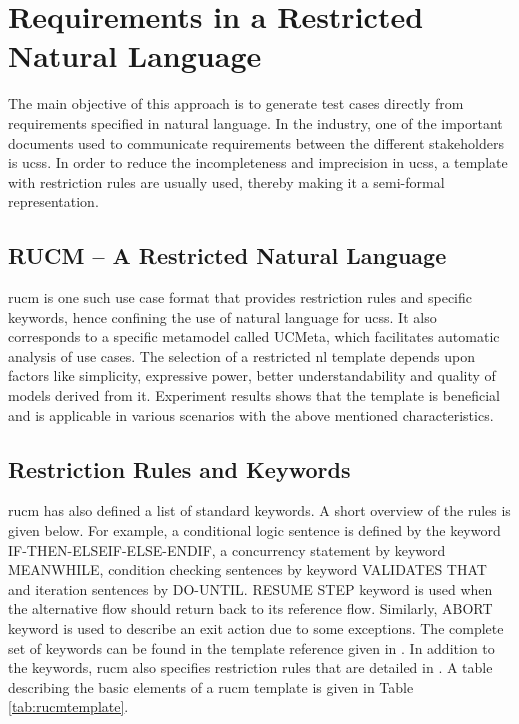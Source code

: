 \section{Requirements in a Restricted Natural Language}
The main objective of this approach is to generate test cases directly from requirements specified in natural language. In the industry, one of the important documents used to communicate requirements between the different stakeholders is \glspl{ucs}. In order to reduce the incompleteness and imprecision in \glspl{ucs}, a template with restriction rules are usually used, thereby making it a semi-formal representation. 

\subsection{RUCM – A Restricted Natural Language}
\gls{rucm} \cite{yue2013facilitating} is one such use case format that provides restriction rules and specific keywords, hence confining the use of natural language for \glspl{ucs}. It also corresponds to a specific metamodel called UCMeta, which facilitates automatic analysis of use cases. The selection of a restricted \gls{nl} template depends upon factors like simplicity, expressive power, better understandability and quality of models derived from it. Experiment results \cite{yue2013facilitating} shows that the template is beneficial and is applicable in various scenarios with the above mentioned characteristics.

\subsection{Restriction Rules and Keywords}
\gls{rucm} has also defined a list of standard keywords. A short overview of the rules is given below. For example, a conditional logic sentence is defined by the keyword IF-THEN-ELSEIF-ELSE-ENDIF, a concurrency statement by keyword MEANWHILE, condition checking sentences by keyword VALIDATES THAT and iteration sentences by DO-UNTIL. RESUME STEP keyword is used when the alternative flow should return back to its reference flow. Similarly, ABORT keyword is used to describe an exit action due to some exceptions.  The complete set of keywords can be found in the template reference given in \cite{yue2013facilitating}. In addition to the keywords, \gls{rucm} also specifies restriction rules that are detailed in \cite{yue2013facilitating}. A table describing the basic elements of a \gls{rucm} template is given in Table \ref{tab:rucmtemplate}.


